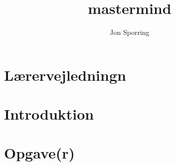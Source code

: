 \documentclass[a4paper,12pt]{article}
\title{mastermind}
\author{Jon Sporring}
\begin{document}
\maketitle

\section{Lærervejledningn}

\section{Introduktion}

\section{Opgave(r)}

\end{document}
